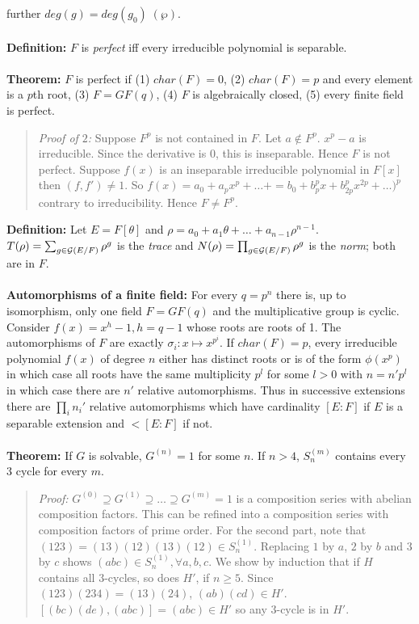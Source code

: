 further $deg(g)= deg(g_0) \; (\wp)$.
\\
\\
{\bf Definition:}
$F$ is \emph{perfect} iff every irreducible polynomial is separable.
\\
\\
{\bf Theorem:} $F$ is perfect if
(1) $char(F)=0$, (2) $char(F)=p$ and every element is a $p$th root,
(3) $F= GF(q)$, (4) $F$ is algebraically closed, (5) every finite field is perfect.
\begin{quote}
\emph{Proof of $2$:}  Suppose $F^p$ is not contained in $F$.  Let $a \notin F^p$.
$x^p-a$ is irreducible.  Since the derivative is $0$, this is inseparable.  Hence
$F$ is not perfect.  Suppose $f(x)$ is an inseparable irreducible polynomial in
$F[x]$ then $(f,f') \ne 1$.  So $f(x)= a_0 +a_p x^p + \ldots + =
b_0 + b_p^px + b_{2p}^p x^{2p} + \ldots)^p$ contrary to irreducibility.
Hence $F \ne F^p$.
\end{quote}
{\bf Definition:}
Let $E=F[\theta]$ and $\rho= a_0 + a_1 \theta + \ldots + a_{n-1} \rho^{n-1}$. 
$T(\rho)= \sum_{g \in {\cal G}(E/F)} \rho^g$ is the \emph{trace} and
$N(\rho)= \prod_{g \in {\cal G}(E/F)} \rho^g$ is the \emph{norm}; both are in $F$.
\\
\\
{\bf Automorphisms of a finite field:}
For every $q=p^n$ there is, up to isomorphism, only one field $F=GF(q)$ and the
multiplicative group is cyclic. Consider $f(x)= x^h-1, h=q-1$ whose roots are
roots of 1.  The automorphisms of $F$ are exactly $\sigma_i : x \mapsto x^{p^i}$.
If $char(F)=p$, every irreducible polynomial $f(x)$ of degree $n$
either has distinct roots or is of
the form $\phi(x^p)$ in which case all roots have the same multiplicity $p^l$ for
some $l>0$ with $n=n' p^l$ in which case there are $n'$ relative automorphisms.  Thus
in successive extensions there are $\prod_i n_i'$ relative automorphisms which have
cardinality
$[E:F]$ if $E$ is a separable extension and $<[E:F]$ if not.
\\
\\
{\bf Theorem:}
If $G$ is solvable, $G^{(n)}=1$ for some $n$.  If $n>4$, $S_{n}^{(m)}$
contains every 3 cycle for every $m$.
\begin{quote}
\emph{Proof:} $G^{(0)} \supseteq G^{(1)} \supseteq \ldots \supseteq G^{(m)} = 1$ is
a composition series with abelian composition factors.  This can be refined into a
composition series with composition factors of prime order.  For the second part,
note that $(123) = (13)(12)(13)(12) \in S_{n}^{(1)}$.  Replacing $1$ by $a$,
$2$ by $b$ and $3$ by $c$ shows $(abc) \in S_{n}^{(1)}, \forall a, b, c$.
We show by induction that if $H$ contains all $3$-cycles, so does $H'$, if $n \ge 5$.
Since $(123)(234) = (13)(24)$, $(ab)(cd) \in H'$. $[(bc)(de),(abc)] =(abc) \in H'$ so
any $3$-cycle is in $H'$.
\end{quote}
